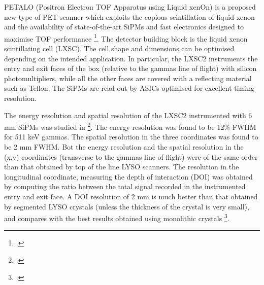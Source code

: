 
PETALO (Positron Electron TOF Apparatus using Liquid xenOn) is a proposed new type of PET scanner which exploits the copious scintillation of liquid xenon and the availability of state-of-the-art SiPMs and fast electronics designed to maximise TOF performance \footcite{Petalo2015}. The detector building block is the liquid xenon scintillating cell (LXSC). The cell shape and dimensions can be optimised depending on the intended application. In particular, the LXSC2 instruments the entry and exit faces of the box (relative to the gammas line of flight) with silicon photomultipliers, while all the other faces are covered with a reflecting material such as Teflon. The SiPMs are read out by ASICs optimised for excellent timing resolution. 
%

The energy resolution and spatial resolution of the LXSC2 instrumented with 6 mm SiPMs was studied in \footcite{Petalo2015}. The energy resolution was found to be 12\% FWHM for 511 keV gammas. The spatial resolution in the three coordinates was found to be 2 mm FWHM. Bot the energy resolution and the spatial resolution in the (x,y) coordinates (transverse to the gammas line of flight) were of the same order than that obtained by top of the line LYSO scanners. The resolution in the longitudinal coordinate, measuring the depth of interaction (DOI) was obtained by computing the ratio between the
total signal recorded in the instrumented entry and exit face. A DOI resolution of 2 mm is much better than that obtained by segmented LYSO crystals (unless the thickness of the crystal is very small), and compares with the best results obtained using monolithic crystals \footcite{VanDamm2011}.
%
